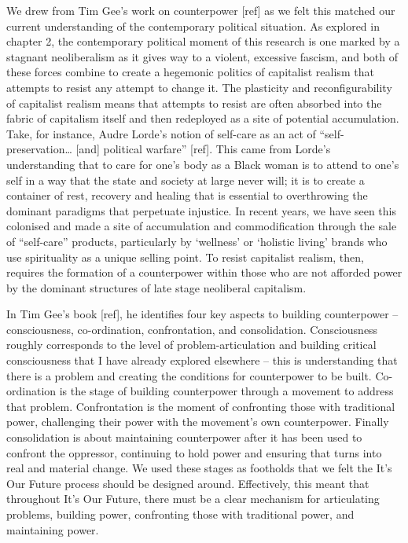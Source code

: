 We drew from Tim Gee’s work on counterpower [ref] as we felt this matched our current understanding of the contemporary political situation. As explored in chapter 2, the contemporary political moment of this research is one marked by a stagnant neoliberalism as it gives way to a violent, excessive fascism, and both of these forces combine to create a hegemonic politics of capitalist realism that attempts to resist any attempt to change it. The plasticity and reconfigurability of capitalist realism means that attempts to resist are often absorbed into the fabric of capitalism itself and then redeployed as a site of potential accumulation. Take, for instance, Audre Lorde’s notion of self-care as an act of “self-preservation… [and] political warfare” [ref]. This came from Lorde’s understanding that to care for one’s body as a Black woman is to attend to one’s self in a way that the state and society at large never will; it is to create a container of rest, recovery and healing that is essential to overthrowing the dominant paradigms that perpetuate injustice. In recent years, we have seen this colonised and made a site of accumulation and commodification through the sale of “self-care” products, particularly by ‘wellness’ or ‘holistic living’ brands who use spirituality as a unique selling point. To resist capitalist realism, then, requires the formation of a counterpower within those who are not afforded power by the dominant structures of late stage neoliberal capitalism. 
	
In Tim Gee’s book [ref], he identifies four key aspects to building counterpower – consciousness, co-ordination, confrontation, and consolidation. Consciousness roughly corresponds to the level of problem-articulation and building critical consciousness that I have already explored elsewhere – this is understanding that there is a problem and creating the conditions for counterpower to be built. Co-ordination is the stage of building counterpower through a movement to address that problem. Confrontation is the moment of confronting those with traditional power, challenging their power with the movement’s own counterpower. Finally consolidation is about maintaining counterpower after it has been used to confront the oppressor, continuing to hold power and ensuring that turns into real and material change. We used these stages as footholds that we felt the It’s Our Future process should be designed around. Effectively, this meant that throughout It’s Our Future, there must be a clear mechanism for articulating problems, building power, confronting those with traditional power, and maintaining power. 

